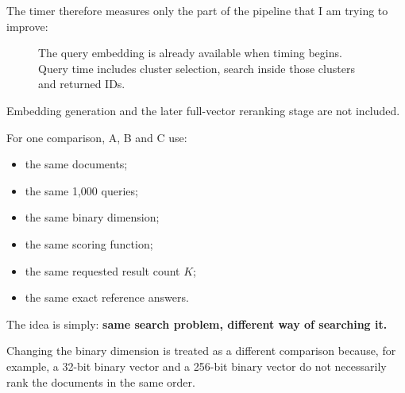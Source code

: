 The timer therefore measures only the part of the pipeline that I am trying to improve:

\begin{figure}[htbp]\centering
{}
\caption{The query embedding is already available when timing begins. Query time includes cluster selection, search inside those clusters and returned IDs.}
\end{figure}

Embedding generation and the later full-vector reranking stage are not included.

For one comparison, A, B and C use:
\begin{itemize}\setlength{\itemsep}{1pt}
\item the same documents;
\item the same 1,000 queries;
\item the same binary dimension;
\item the same scoring function;
\item the same requested result count $K$;
\item the same exact reference answers.
\end{itemize}
The idea is simply: \textbf{same search problem, different way of searching it.}

Changing the binary dimension is treated as a different comparison because, for example, a 32-bit binary vector and a 256-bit binary vector do not necessarily rank the documents in the same order.

